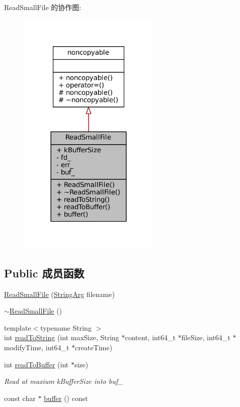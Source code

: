 Read\+Small\+File 的协作图\+:
\nopagebreak
\begin{figure}[H]
\begin{center}
\leavevmode
\includegraphics[width=192pt]{classmuduo_1_1FileUtil_1_1ReadSmallFile__coll__graph}
\end{center}
\end{figure}
\subsection*{Public 成员函数}
\begin{DoxyCompactItemize}
\item 
\hyperlink{classmuduo_1_1FileUtil_1_1ReadSmallFile_acd3eba8bbc84e42edd1ad5d7be6e41bf}{Read\+Small\+File} (\hyperlink{classmuduo_1_1StringArg}{String\+Arg} filename)
\item 
\hyperlink{classmuduo_1_1FileUtil_1_1ReadSmallFile_a8acf775ef72f1afce8864be5857de949}{$\sim$\+Read\+Small\+File} ()
\item 
{\footnotesize template$<$typename String $>$ }\\int \hyperlink{classmuduo_1_1FileUtil_1_1ReadSmallFile_a0acd2c32d596b47c7e96c849094a324e}{read\+To\+String} (int max\+Size, String $\ast$content, int64\+\_\+t $\ast$file\+Size, int64\+\_\+t $\ast$modify\+Time, int64\+\_\+t $\ast$create\+Time)
\item 
int \hyperlink{classmuduo_1_1FileUtil_1_1ReadSmallFile_ac8747a6f57ac42695bea92336ef34216}{read\+To\+Buffer} (int $\ast$size)
\begin{DoxyCompactList}\small\item\em Read at maxium k\+Buffer\+Size into buf\+\_\+ \end{DoxyCompactList}\item 
const char $\ast$ \hyperlink{classmuduo_1_1FileUtil_1_1ReadSmallFile_a93eb423e7ffe9dfb42eb003f80f4c47e}{buffer} () const
\end{DoxyCompactItemize}
